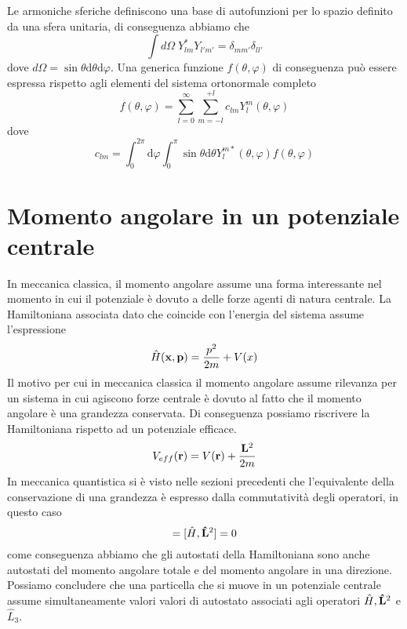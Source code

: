 Le armoniche sferiche definiscono una base di autofunzioni per lo spazio definito da una sfera unitaria, di conseguenza abbiamo che 
\begin{equation*}
	\int d\Omega \; Y_{lm}^*Y_{l'm'} = \delta_{mm'}\delta_{ll'}
\end{equation*}
dove $d \Omega = \sin \theta \text{d}\theta \text{d}\varphi$. Una generica funzione $f(\theta,\varphi)$ di conseguenza pu\`o essere espressa rispetto agli elementi del sistema ortonormale completo
\begin{equation*}
	f(\theta,\varphi) = \sum_{l=0}^{\infty} \sum_{m=-l}^{+l}c_{lm}Y^m_l(\theta,\varphi)
\end{equation*}
dove
\begin{equation*}
	c_{lm} = \int_{0}^{2\pi} \text{d}\varphi\int_{0}^{\pi}\sin \theta \text{d}\theta Y_l^{m*}(\theta,\varphi)f(\theta,\varphi)
\end{equation*}

\section{Momento angolare in un potenziale centrale}

In meccanica classica, il momento angolare assume una forma interessante nel momento in cui il potenziale \`e dovuto a delle forze agenti di natura centrale. La Hamiltoniana associata dato che coincide con l'energia del sistema assume l'espressione
\begin{equation*}
	\hat{H}(\bold{x},\bold{p}) = \frac{p^2}{2m} + V(x)
\end{equation*}
Il motivo per cui in meccanica classica il momento angolare assume rilevanza per un sistema in cui agiscono forze centrale \`e dovuto al fatto che il momento angolare \`e una grandezza conservata. Di conseguenza possiamo riscrivere la Hamiltoniana rispetto ad un potenziale efficace.
\begin{equation*}
	V_{eff}(\bold{r}) = V(\bold{r}) + \frac{\bold{L}^2}{2m} 
\end{equation*}
In meccanica quantistica si \`e visto nelle sezioni precedenti che l'equivalente della conservazione di una grandezza \`e espresso dalla commutativit\`a degli operatori, in questo caso
\begin{equation*}
	[\hat{H},\hat{L}_{i}] = [\hat{H},\bold{\hat{L}}^2] = 0
\end{equation*} 
come conseguenza abbiamo che gli autostati della Hamiltoniana sono anche autostati del momento angolare totale e del momento angolare in una direzione. Possiamo concludere che una particella che si muove in un potenziale centrale assume simultaneamente valori valori di autostato associati agli operatori $\hat{H}, \bold{\hat{L}}^2$ e $\hat{L}_{3}$.

